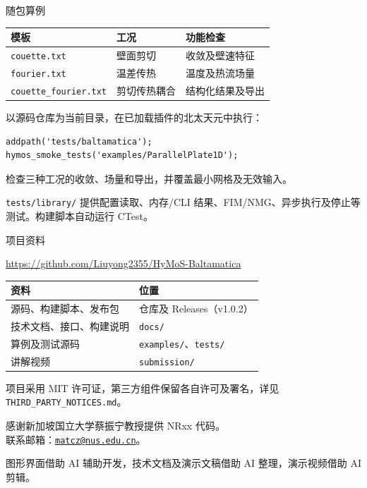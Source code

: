 \documentclass[aspectratio=1610]{ctexbeamer}
\newcommand{\subhead}[1]{\par\noindent{\color{structure.fg}\bfseries #1}\par\smallskip}
\begin{document}
\begin{frame}[fragile]{随包算例}
\small
\renewcommand\arraystretch{1.35}
\noindent\begin{tabularx}{\textwidth}{@{}p{}YY@{}}
\toprule
模板 & 工况 & 功能检查\\
\midrule
\texttt{couette.txt} & 壁面剪切 & 收敛及壁速特征\\
\texttt{fourier.txt} & 温差传热 & 温度及热流场量\\
\texttt{couette\_fourier.txt} & 剪切传热耦合 & 结构化结果及导出\\
\bottomrule
\end{tabularx}
\par\vspace{0.25cm}
\subhead{宿主集成检查}
以源码仓库为当前目录，在已加载插件的北太天元中执行：
\begin{lstlisting}
addpath('tests/baltamatica');
hymos_smoke_tests('examples/ParallelPlate1D');
\end{lstlisting}
检查三种工况的收敛、场量和导出，并覆盖最小网格及无效输入。
\par\vspace{0.22cm}
\subhead{源码回归}
\texttt{tests/library/} 提供配置读取、内存/CLI 结果、FIM/NMG、异步执行及停止等测试。构建脚本自动运行 CTest。
\end{frame}

\begin{frame}{项目资料}
\subhead{公开仓库}
\url{https://github.com/Liuyong2355/HyMoS-Baltamatica}
\par\vspace{0.25cm}
\small
\noindent\begin{tabularx}{\textwidth}{@{}p{}Y@{}}
\toprule
资料 & 位置\\
\midrule
源码、构建脚本、发布包 & 仓库及 Releases（v1.0.2）\\
技术文档、接口、构建说明 & \texttt{docs/}\\
算例及测试源码 & \texttt{examples/}、\texttt{tests/}\\
讲解视频 & \texttt{submission/}\\
\bottomrule
\end{tabularx}
\par\vspace{0.25cm}
项目采用 MIT 许可证，第三方组件保留各自许可及署名，详见 \texttt{THIRD\_PARTY\_NOTICES.md}。
\par\vspace{0.4cm}
\subhead{致谢}
感谢新加坡国立大学蔡振宁教授提供 NRxx 代码。\\[0.4em]
联系邮箱：\href{mailto:matcz@nus.edu.cn}{\nolinkurl{matcz@nus.edu.cn}}。
\par\vfill
{\footnotesize 图形界面借助 AI 辅助开发，技术文档及演示文稿借助 AI 整理，演示视频借助 AI 剪辑。}
\end{frame}
\end{document}
